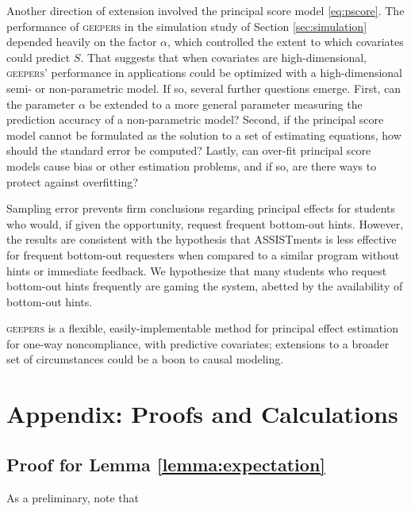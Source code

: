 \documentclass[]{article}
\begin{document}
Another direction of extension involved the principal score model \eqref{eq:pscore}.
The performance of \textsc{geepers} in the simulation study of Section \ref{sec:simulation} depended heavily on the factor $\alpha$, which controlled the extent to which covariates could predict $S$.
That suggests that when covariates are high-dimensional, \textsc{geepers}' performance in applications could be optimized with a high-dimensional semi- or non-parametric model.
If so, several further questions emerge.
First, can the parameter $\alpha$ be extended to a more general parameter measuring the prediction accuracy of a non-parametric model?
Second, if the principal score model cannot be formulated as the solution to a set of estimating equations, how should the standard error be computed?
Lastly, can over-fit principal score models cause bias or other estimation problems, and if so, are there ways to protect against overfitting?

Sampling error prevents firm conclusions regarding principal effects for students who would, if given the opportunity, request frequent bottom-out hints.
However, the results are consistent with the hypothesis that ASSISTments is less effective for frequent bottom-out requesters when compared to a similar program without hints or immediate feedback. We hypothesize that many students who request bottom-out hints frequently are gaming the system, abetted by the availability of bottom-out hints.

\textsc{geepers} is a flexible, easily-implementable method for principal effect estimation for one-way noncompliance, with predictive covariates; extensions to a broader set of circumstances could be a boon to causal modeling.







\appendix

\section*{Appendix: Proofs and Calculations}
\subsection*{Proof for Lemma \ref{lemma:expectation}}
As a preliminary, note that
\end{document}
